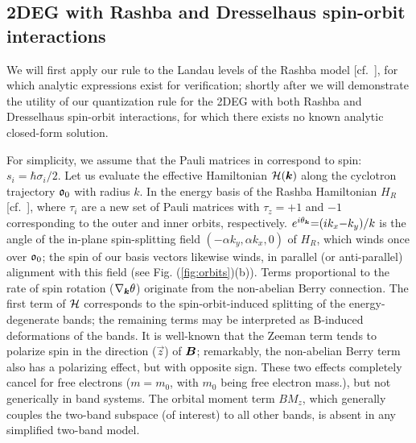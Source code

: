 \documentclass[aps, prb, showpacs, twocolumn, notitlepage, superscriptaddress]{revtex4-1}
\begin{document}
\subsection{2DEG with Rashba and Dresselhaus spin-orbit interactions}\label{sec:Rashba}



We will first apply our rule to the Landau levels of the Rashba model [cf.\ ], for which analytic expressions exist for verification; shortly after we will demonstrate the utility of our quantization rule for the 2DEG with both Rashba and Dresselhaus spin-orbit interactions, for which there exists no known analytic closed-form solution. 

For simplicity, we assume that the Pauli matrices in  correspond to spin: $s_i{=}\hbar \sigma_i/2$. Let us evaluate the effective Hamiltonian ${\cal H}(\boldsymbol{k})$  along the cyclotron trajectory $\mathfrak{o}_0$ with radius $k$. In the  energy basis of the Rashba Hamiltonian $H_R$ [cf.\ ], 
where $\tau_i$ are a new set of Pauli matrices with $\tau_z{=}{+} 1$ and ${-}1$ corresponding to the outer and inner orbits, respectively. $e^{i\theta_{\boldsymbol{k}}}{=}(ik_x{-}k_y)/k$ is the angle of the in-plane spin-splitting field $({-}\alpha k_y,\alpha k_x,0)$ of $H_R$, which winds once over $\mathfrak{o}_0$; the spin of our basis vectors likewise winds, in parallel (or anti-parallel) alignment with this field (see Fig. (\ref{fig:orbits})(b)). Terms proportional to the rate of spin rotation  ($\nabla_{\boldsymbol{k}} \theta$) originate from the non-abelian Berry connection. The first term of  ${\cal H}$ corresponds to the spin-orbit-induced splitting of the energy-degenerate bands;
the remaining terms may be interpreted as B-induced deformations of the bands.   It is well-known that the Zeeman term tends to polarize spin in the direction ($\vec{z}$) of $\boldsymbol{B}$; remarkably, the non-abelian Berry term   also has a polarizing effect, but with opposite sign. These two effects completely cancel for free electrons ($m{=}m_0$, with $m_0$ being free electron mass.), but not generically in band systems. The orbital moment term $B M_z$, which generally couples the two-band subspace (of interest) to all other bands, is absent in any simplified two-band model.
\end{document}
